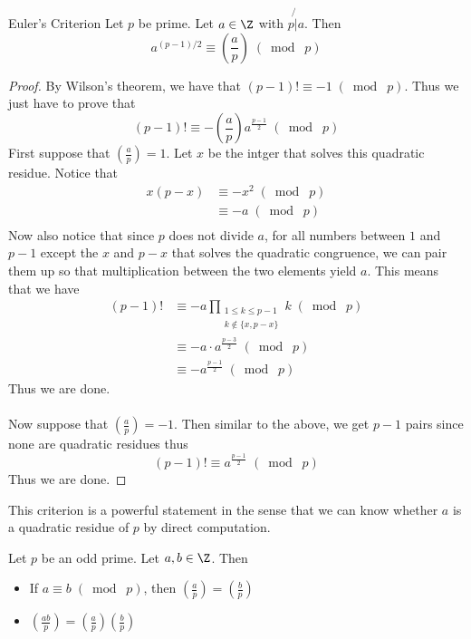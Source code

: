 \begin{thm}{Euler's Criterion}{} Let $p$ be prime. Let $a\in\Z$ with $p\not{|}a$. Then $$a^{(p-1)/2}\equiv\left(\frac{a}{p}\right)\;(\bmod\; p)$$ \tcbline
\begin{proof}
By Wilson's theorem, we have that $(p-1)!\equiv -1\;(\bmod\;p)$. Thus we just have to prove that $$(p-1)!\equiv-\left(\frac{a}{p}\right)a^{\frac{p-1}{2}}\;(\bmod\;p)$$
First suppose that $\left(\frac{a}{p}\right)=1$. Let $x$ be the intger that solves this quadratic residue. Notice that 
\begin{align*}
x(p-x)&\equiv -x^2\;(\bmod\;p)\\
&\equiv -a\;(\bmod\;p)\\
\end{align*}
Now also notice that since $p$ does not divide $a$, for all numbers between $1$ and $p-1$ except the $x$ and $p-x$ that solves the quadratic congruence, we can pair them up so that multiplication between the two elements yield $a$. This means that we have 
\begin{align*}
(p-1)!&\equiv -a\prod_{\substack{1\leq k\leq p-1\\k\notin\{x,p-x\}}}k\;(\bmod\;p)\\
&\equiv -a\cdot a^{\frac{p-3}{2}}\;(\bmod\;p)\\
&\equiv -a^{\frac{p-1}{2}}\;(\bmod\;p)
\end{align*}
Thus we are done. \\~\\
Now suppose that $\left(\frac{a}{p}\right)=-1$. Then similar to the above, we get $p-1$ pairs since none are quadratic residues thus $$(p-1)!\equiv a^{\frac{p-1}{2}}\;(\bmod\;p)$$
Thus we are done. 
\end{proof}
\end{thm}

This criterion is a powerful statement in the sense that we can know whether $a$ is a quadratic residue of $p$ by direct computation. 

\begin{prp}{}{} Let $p$ be an odd prime. Let $a,b\in\Z$. Then
\begin{itemize}
\item If $a\equiv b\;(\bmod\; p)$, then $\left(\frac{a}{p}\right)=\left(\frac{b}{p}\right)$
\item $\left(\frac{ab}{p}\right)=\left(\frac{a}{p}\right)\left(\frac{b}{p}\right)$
\end{itemize}
\end{prp}

